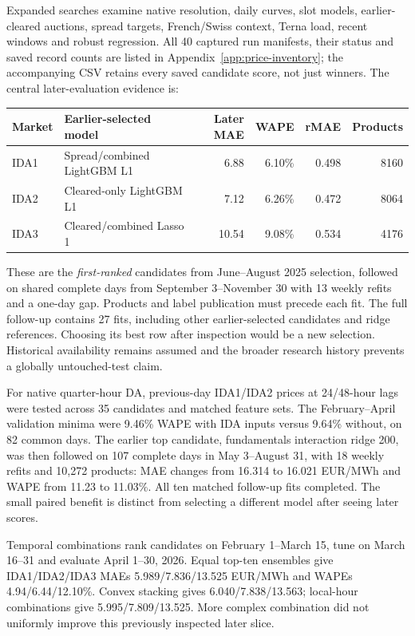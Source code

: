 Expanded searches examine native resolution, daily curves, slot models,
earlier-cleared auctions, spread targets, French/Swiss context, Terna load,
recent windows and robust regression. All 40 captured run manifests, their
status and saved record counts are listed in Appendix~\ref{app:price-inventory};
the accompanying CSV retains every saved candidate score, not just winners.
The central later-evaluation evidence is:
\begin{center}\small
\begin{tabular}{llrrrr}
\toprule Market & Earlier-selected model & Later MAE & WAPE & rMAE & Products\\\midrule
IDA1 & Spread/combined LightGBM L1 & 6.88 & 6.10\% & 0.498 & 8160\\
IDA2 & Cleared-only LightGBM L1 & 7.12 & 6.26\% & 0.472 & 8064\\
IDA3 & Cleared/combined Lasso 1 & 10.54 & 9.08\% & 0.534 & 4176\\
\bottomrule\end{tabular}\end{center}
These are the \emph{first-ranked} candidates from June--August 2025 selection,
followed on shared complete days from September 3--November 30 with 13 weekly
refits and a one-day gap. Products and label publication must precede each fit.
The full follow-up contains 27 fits, including other earlier-selected candidates
and ridge references. Choosing its best row after inspection would be a new
selection. Historical availability remains assumed and the broader research
history prevents a globally untouched-test claim.

For native quarter-hour DA, previous-day IDA1/IDA2 prices at 24/48-hour lags
were tested across 35 candidates and matched feature sets. The February--April
validation minima were 9.46\% WAPE with IDA inputs versus 9.64\% without, on
82 common days. The earlier top candidate, fundamentals interaction ridge 200,
was then followed on 107 complete days in May 3--August 31, with 18 weekly
refits and 10,272 products: MAE changes from 16.314 to 16.021 EUR/MWh and
WAPE from 11.23 to 11.03\%. All ten matched follow-up fits completed.
The small paired benefit is distinct from selecting a different model after
seeing later scores.

Temporal combinations rank candidates on February 1--March 15, tune on
March 16--31 and evaluate April 1--30, 2026. Equal top-ten ensembles give
IDA1/IDA2/IDA3 MAEs 5.989/7.836/13.525 EUR/MWh and WAPEs
4.94/6.44/12.10\%. Convex stacking gives 6.040/7.838/13.563; local-hour
combinations give 5.995/7.809/13.525. More complex combination did not
uniformly improve this previously inspected later slice.

